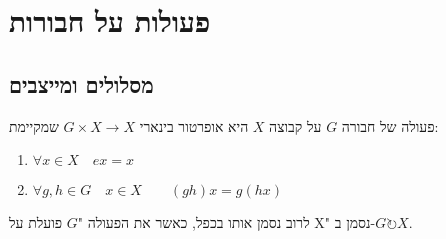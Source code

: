 \documentclass{tstextbook}
\begin{document}
\section{פעולות על חבורות}

\subsection{מסלולים ומייצבים}

\begin{definition}
פעולה של חבורה \(G\) על קבוצה \(X\) היא אופרטור בינארי \(G\times X\to X\) שמקיימת:

\end{definition}
\begin{enumerate}
  \item \(\forall x \in X\quad ex=x\)


  \item \(\forall g,h \in G \quad x \in X \qquad (gh)x=g(hx)\)


\end{enumerate}
לרוב נסמן אותו בכפל, כאשר את הפעולה "\(G\) פועלת על X" נסמן ב-\(G\circlearrowright X\).
\end{document}
